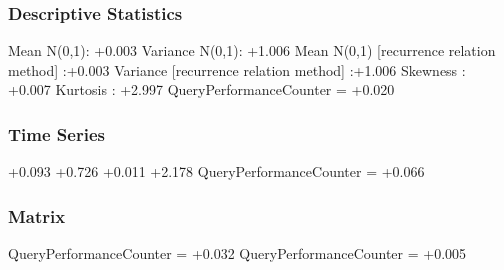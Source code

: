 \documentclass[9pt]{article}
\theoremstyle{plain}
\theoremstyle{definition}
\theoremstyle{remark}
\numberwithin{equation}{section}
\begin{document}
\subsubsection{Descriptive Statistics}
Mean N(0,1): +0.003
Variance N(0,1): +1.006
Mean N(0,1) [recurrence relation method] :+0.003
Variance [recurrence relation method] :+1.006
Skewness : +0.007
Kurtosis : +2.997
QueryPerformanceCounter  =  +0.020
\subsubsection{Time Series }
+0.093
+0.726
+0.011
+2.178
QueryPerformanceCounter  =  +0.066
\subsubsection{Matrix}
QueryPerformanceCounter  =  +0.032
QueryPerformanceCounter  =  +0.005
\end{document}
